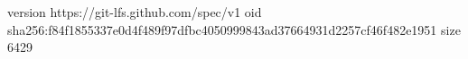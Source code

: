 version https://git-lfs.github.com/spec/v1
oid sha256:f84f1855337e0d4f489f97dfbc4050999843ad37664931d2257cf46f482e1951
size 6429
